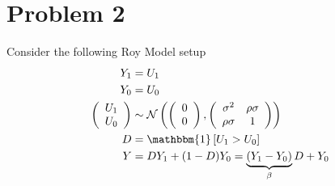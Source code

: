 \documentclass{article}
\begin{document}
\newpage
\section*{Problem 2}

Consider the following Roy Model setup
\textbf{\begin{align*}
\begin{aligned}
    Y_{1} &=U_{1} \\
    Y_{0} &=U_{0} \\
    \left(\begin{array}{c}
    U_{1} \\
    U_{0}
    \end{array}\right) & \sim \mathcal{N}\left(\left(\begin{array}{l}
    0 \\
    0
    \end{array}\right),\left(\begin{array}{cc}
    \sigma^{2} & \rho \sigma \\
    \rho \sigma & 1
    \end{array}\right)\right) \\
    D &=\mathbbm{1}\left[U_{1}>U_{0}\right] \\
    Y &=D Y_{1}+(1-D) Y_{0}=\underbrace{\left(Y_{1}-Y_{0}\right)}_{\beta} D+Y_{0}
\end{aligned}
\end{align*}}
\end{document}
